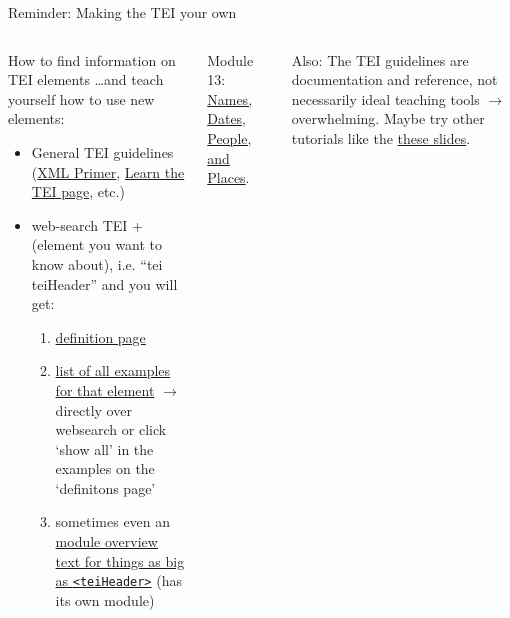 \begin{frame}[allowframebreaks]{Reminder: Making the TEI your own}
\small
{}

\begin{columns}
    \begin{block}{How to find information on TEI elements}
    \dots and teach yourself how to use new elements:
\begin{itemize}\footnotesize
    \item General TEI guidelines (\href{https://tei-c.org/release/doc/tei-p5-doc/en/html/SG.html}{XML Primer}, \href{https://tei-c.org/support/learn/}{Learn the TEI page}, etc.)
    \item web-search TEI + (element you want to know about), i.e. ``tei teiHeader'' and you will get:
    \begin{enumerate}\scriptsize
        \item \href{https://www.tei-c.org/release/doc/tei-p5-doc/en/html/ref-teiHeader.html}{definition page}
        \item \href{https://www.tei-c.org/release/doc/tei-p5-doc/en/html/examples-teiHeader.html}{list of all examples for that element} $\to$ directly over websearch or click `show all' in the examples on the `definitons page'
        \item sometimes even an \href{https://www.tei-c.org/release/doc/tei-p5-doc/en/html/HD.html}{module overview text for things as big as \texttt{<teiHeader>}} (has its own module)
    \end{enumerate}
\end{itemize}
    \end{block}



\begin{block}{Module 13:}
\href{https://tei-c.org/release/doc/tei-p5-doc/en/html/ND.html}{Names, Dates, People, and Places}.
\end{block}

\begin{block}{}
\footnotesize
Also: The TEI guidelines are documentation and reference, not necessarily ideal teaching tools $\to$ overwhelming. 
Maybe try other tutorials like the \href{http://gams.uni-graz.at/o:dhoxss2016-tei-names}{these slides}.
\end{block}

\end{columns}

\end{frame}

